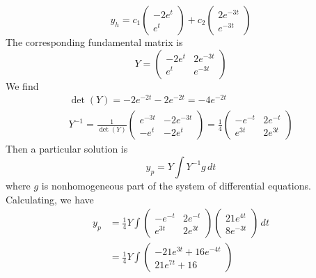\documentclass[11pt, titlepage]{article}
\begin{document}
\begin{solution}
        \[
        y_h = c_1 
        \begin{pmatrix}
            -2e^{t} \\
            e^{t}
        \end{pmatrix} + c_2
        \begin{pmatrix}
            2e^{-3t} \\
            e^{-3t}
        \end{pmatrix}
        \] 
        The corresponding fundamental matrix is
        \[
        Y = 
        \begin{pmatrix}
            -2e^{t} & 2e^{-3t} \\
            e^{t} & e^{-3t}
        \end{pmatrix}
        \] 
        We find
        \begin{gather*}
            \det(Y) = -2e^{-2t} - 2e^{-2t} = -4e^{-2t} \\
            Y^{-1} = \frac{1}{\det(Y)} 
            \begin{pmatrix}
                e^{-3t} & -2e^{-3t} \\
                -e^{t} & -2e^{t}
            \end{pmatrix} = \frac{1}{4}
            \begin{pmatrix}
                -e^{-t} & 2e^{-t} \\
                e^{3t} & 2e^{3t}
            \end{pmatrix}
        \end{gather*}
        Then a particular solution is
        \[
        y_p = Y \int Y^{-1} g \, dt
        \] 
        where $g$ is nonhomogeneous part of the system of differential
        equations. Calculating, we have
        \begin{align*}
            y_p &= \frac{1}{4} Y \int 
            \begin{pmatrix}
                -e^{-t} & 2e^{-t} \\
                e^{3t} & 2e^{3t}
            \end{pmatrix}
            \begin{pmatrix}
                21 e^{4t} \\
                8 e^{-3t}
            \end{pmatrix} \, dt \\
                &= \frac{1}{4} Y \int
                \begin{pmatrix}
                    -21e^{3t} + 16e^{-4t} \\
                    21e^{7t} + 16

\end{pmatrix}
\end{align*}
\end{solution}
\end{document}
